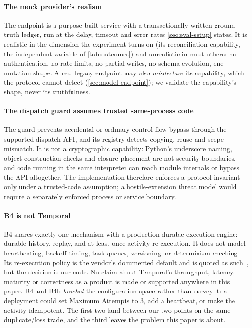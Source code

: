 \paragraph{The mock provider's realism} The endpoint is a purpose-built service
with a transactionally written ground-truth ledger, run at the delay, timeout
and error rates \cref{sec:eval-setup} states. It is realistic in the dimension
the experiment turns on (its reconciliation capability, the independent
variable of \cref{tab:outcomes}) and unrealistic in most others: no
authentication, no rate limits, no partial writes, no schema evolution, one
mutation shape. A real legacy endpoint may also \emph{misdeclare} its
capability, which the protocol cannot detect (\cref{sec:model-endpoint}); we
validate the capability's shape, never its truthfulness.

\paragraph{The dispatch guard assumes trusted same-process code} The guard
prevents accidental or ordinary control-flow bypass through the supported
dispatch API, and its registry detects copying, reuse and scope mismatch. It is
not a cryptographic capability: Python's underscore naming,
object-construction checks and closure placement are not security boundaries,
and code running in the same interpreter can reach module internals or bypass
the API altogether. The implementation therefore enforces a protocol invariant
only under a trusted-code assumption; a hostile-extension threat model would
require a separately enforced process or service boundary.

\paragraph{B4 is not Temporal} B4 shares exactly one mechanism with a production
durable-execution engine: durable history, replay, and at-least-once activity
re-execution. It does not model heartbeating, backoff timing, task queues,
versioning, or determinism checking. Its re-execution policy is the vendor's
documented default and is quoted as such~\cite{temporal-retry}, but the decision
is our code. No claim about Temporal's throughput, latency, maturity or
correctness as a product is made or supported anywhere in this paper. B4 and B4b
\emph{bracket} the configuration space rather than survey it: a deployment could
set Maximum Attempts to 3, add a heartbeat, or make the activity idempotent.
The first two land between our two points on the same duplicate/loss trade, and
the third leaves the problem this paper is about.

